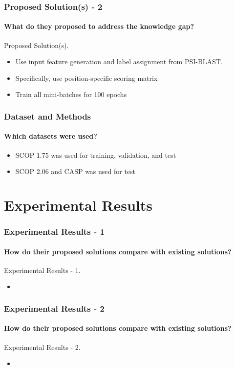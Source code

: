 \documentclass[xcolor={usenames,dvipsnames},hyperref={hyperindex,bookmarks}]{beamer}
\begin{document}
\frame
{
	\frametitle{Proposed Solution(s) - 2}
	\framesubtitle{What do they proposed to address the knowledge gap?}

	Proposed Solution(s).
	\begin{itemize}
	\item Use input feature generation and label assignment from PSI-BLAST.
	\item Specifically, use position-specific scoring matrix
	\item Train all mini-batches for 100 epochs
	\end{itemize}
}




\frame
{
	\frametitle{Dataset and Methods}
	\framesubtitle{Which datasets were used?}

	\begin{itemize}
	\item SCOP 1.75 was used for training, validation, and test
	\item SCOP 2.06 and CASP was used for test
	\end{itemize}
}














\section{Experimental Results}


\frame
{
	\frametitle{Experimental Results - 1}
	\framesubtitle{How do their proposed solutions compare with existing solutions?}

	Experimental Results - 1.
	\begin{itemize}
	\item 
	\end{itemize}

}








\frame
{
	\frametitle{Experimental Results - 2}
	\framesubtitle{How do their proposed solutions compare with existing solutions?}

	Experimental Results - 2.
	\begin{itemize}
	\item 
	\end{itemize}

}
\end{document}
